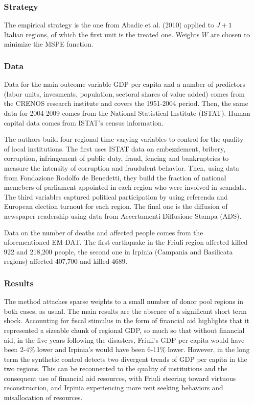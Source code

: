 \documentclass[12pt,a4paper,draft]{article}
\begin{document}
\subsubsection*{Strategy}
The empirical strategy is the one from Abadie et al. (2010) applied to $J+1$ Italian regions, of 
which the first unit is the treated one. 
Weights $W$ are chosen to minimize the MSPE function. 



\subsubsection*{Data}
Data for the main outcome variable GDP per capita and a 
number of predictors (labor units, invesments, population, sectoral shares of value added) comes 
from the CRENOS research institute and covers the 1951-2004 period. Then, the same data for 
2004-2009 comes from the National Statistical Institute (ISTAT). Human capital data comes from 
ISTAT's census information.

The authors build four regional time-varying variables to control for the quality of 
local institutions. The first uses ISTAT data on embezzlement, bribery, corruption, infringement 
of public duty, fraud, fencing and bankruptcies to measure the intensity of corruption and 
fraudulent behavior. Then, using data from Fondazione Rodolfo de Benedetti, they build the fraction 
of national memebers of parliament appointed in each region who were involved in scandals. 
The third variables captured political participation by using referenda and European election 
turnout for each region. The final one is the diffusion of newspaper readership using data 
from Accertamenti Diffusione Stampa (ADS).

Data on the number of deaths and affected people comes from the aforementioned EM-DAT. The 
first earthquake in the Friuli region affected killed 922 and 218,200 people, the second one 
in Irpinia (Campania and Basilicata regions) affected 407,700 and killed 4689.

\subsubsection*{Results}
The method attaches sparse weights to a small number of donor pool regions in both cases, as usual.
The main results are the absence of a significant short term shock. Accounting for fiscal stimulus 
in the form of financial aid highlights that it represented a sizeable chunk of regional GDP, so much 
so that without financial aid, in the five years following the disasters, Friuli's GDP per capita would 
have been 2-4\% lower and Irpinia's would have been 6-11\% lower. However, in the long term the synthetic 
control detects two divergent trends of GDP per capita in the two regions. This can be reconnected to 
the quality of institutions and the consequent use of financial aid resources, with Friuli steering 
toward virtuous reconstruction, and Irpinia experiencing more rent seeking behaviors and misallocation 
of resources.  
\end{document}

